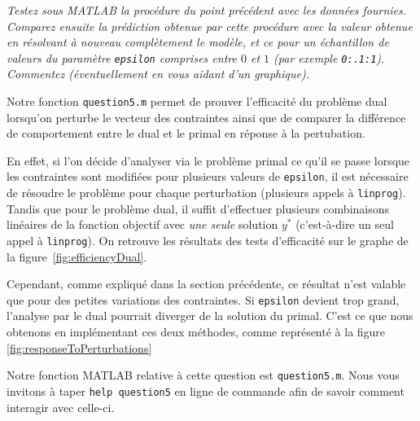 \question %
\emph{Testez sous MATLAB la procédure du point précédent avec les données
fournies. Comparez ensuite la prédiction obtenue par cette procédure
avec la valeur obtenue en résolvant à nouveau complètement le modèle,
et ce pour un échantillon de valeurs du paramètre \texttt{epsilon} comprises
entre $0$ et $1$ (par exemple \texttt{0:.1:1}).
Commentez (éventuellement en vous aidant d'un graphique).}

Notre fonction \texttt{question5.m} permet de prouver l'efficacité
du problème dual lorsqu'on perturbe le vecteur des contraintes
ainsi que de comparer la différence de comportement entre le dual
et le primal en réponse à la pertubation.

En effet, si l'on décide d'analyser via le problème primal ce qu'il
se passe lorsque les contraintes sont modifiées pour plusieurs valeurs de \texttt{epsilon}, il est nécessaire de
résoudre le problème pour chaque perturbation
(plusieurs appels à \texttt{linprog}).
Tandis que pour le problème dual,
il suffit d'effectuer plusieurs combinaisons linéaires de la fonction objectif
avec \emph{une seule} solution $y^{*}$
(c'est-à-dire un seul appel à \texttt{linprog}).
On retrouve les résultats des tests d'efficacité
sur le graphe de la figure~\ref{fig:efficiencyDual}.

Cependant, comme expliqué dans la section précédente, ce résultat n'est valable que pour des petites variations des contraintes.
Si \texttt{epsilon} devient trop grand, l'analyse par le dual pourrait diverger de la solution du primal.
C'est ce que nous obtenons en implémentant ces deux méthodes, comme représenté à la figure \ref{fig:responseToPerturbations}

Notre fonction MATLAB relative à cette question est \texttt{question5.m}. Nous vous invitons à taper \texttt{help question5} en ligne de commande afin de savoir comment interagir avec celle-ci.

